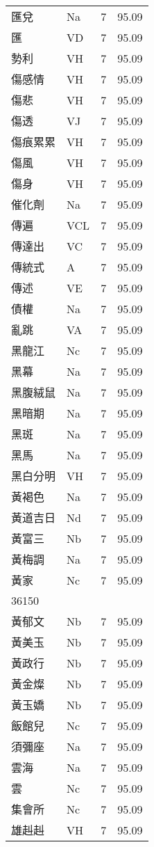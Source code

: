 \documentclass[twocolumn]{book}
\begin{document}
\begin{supertabular}{llrr}
匯兌 & Na & 7 &  95.09\\
匯 & VD & 7 &  95.09\\
勢利 & VH & 7 &  95.09\\
傷感情 & VH & 7 &  95.09\\
傷悲 & VH & 7 &  95.09\\
傷透 & VJ & 7 &  95.09\\
傷痕累累 & VH & 7 &  95.09\\
傷風 & VH & 7 &  95.09\\
傷身 & VH & 7 &  95.09\\
催化劑 & Na & 7 &  95.09\\
傳遍 & VCL & 7 &  95.09\\
傳達出 & VC & 7 &  95.09\\
傳統式 & A & 7 &  95.09\\
傳述 & VE & 7 &  95.09\\
債權 & Na & 7 &  95.09\\
亂跳 & VA & 7 &  95.09\\
黑龍江 & Nc & 7 &  95.09\\
黑幕 & Na & 7 &  95.09\\
黑腹絨鼠 & Na & 7 &  95.09\\
黑暗期 & Na & 7 &  95.09\\
黑斑 & Na & 7 &  95.09\\
黑馬 & Na & 7 &  95.09\\
黑白分明 & VH & 7 &  95.09\\
黃褐色 & Na & 7 &  95.09\\
黃道吉日 & Nd & 7 &  95.09\\
黃富三 & Nb & 7 &  95.09\\
黃梅調 & Na & 7 &  95.09\\
黃家 & Nc & 7 &  95.09\\
36150\\
黃郁文 & Nb & 7 &  95.09\\
黃美玉 & Nb & 7 &  95.09\\
黃政行 & Nb & 7 &  95.09\\
黃金燦 & Nb & 7 &  95.09\\
黃玉嬌 & Nb & 7 &  95.09\\
飯館兒 & Nc & 7 &  95.09\\
須彌座 & Na & 7 &  95.09\\
雲海 & Na & 7 &  95.09\\
雲 & Nc & 7 &  95.09\\
集會所 & Nc & 7 &  95.09\\
雄赳赳 & VH & 7 &  95.09\\

\end{supertabular}
\end{document}
